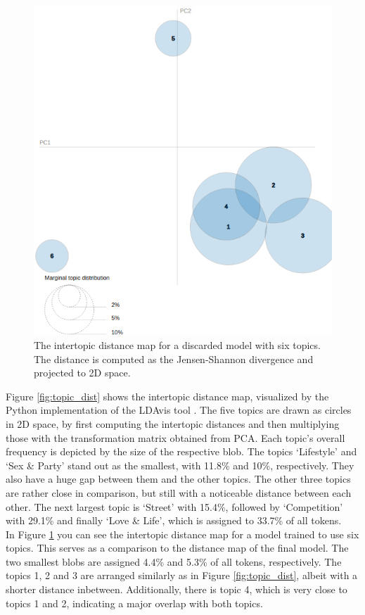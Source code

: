 \documentclass[conference]{IEEEtran}
\begin{document}
\begin{figure}[!t]
\includegraphics[width=\linewidth]{figures/topic_dist_bad.png}
\vspace*{-8mm}
\caption{The intertopic distance map for a discarded model with six topics. The distance is computed as the Jensen-Shannon divergence and projected to 2D space.}
\label{fig:topic_dist_bad}
\end{figure}

Figure \ref{fig:topic_dist} shows the intertopic distance map, visualized by the Python implementation of the LDAvis tool \cite{sievert-shirley-2014-ldavis}. The five topics are drawn as circles in 2D space, by first computing the intertopic distances and then multiplying those with the transformation matrix obtained from PCA. Each topic's overall frequency is depicted by the size of the respective blob. The topics {\lq}Lifestyle{\rq} and {\lq}Sex \& Party{\rq} stand out as the smallest, with 11.8\% and 10\%, respectively. They also have a huge gap between them and the other topics. The other three topics are rather close in comparison, but still with a noticeable distance between each other. The next largest topic is {\lq}Street{\rq} with 15.4\%, followed by {\lq}Competition{\rq} with 29.1\% and finally {\lq}Love \& Life{\rq}, which is assigned to 33.7\% of all tokens.\\
In Figure \ref{fig:topic_dist_bad} you can see the intertopic distance map for a model trained to use six topics. This serves as a comparison to the distance map of the final model. The two smallest blobs are assigned 4.4\% and 5.3\% of all tokens, respectively. The topics 1, 2 and 3 are arranged similarly as in Figure \ref{fig:topic_dist}, albeit with a shorter distance inbetween. Additionally, there is topic 4, which is very close to topics 1 and 2, indicating a major overlap with both topics.
\end{document}

